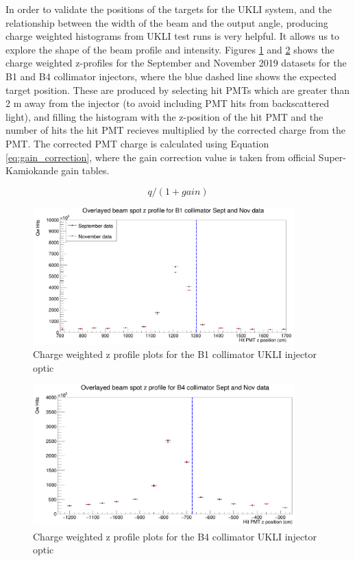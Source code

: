In order to validate the positions of the targets for the UKLI system, and the relationship between the width of the beam and the output angle, producing charge weighted histograms from UKLI test runs is very helpful. It allows us to explore the shape of the beam profile and intensity. Figures \ref{fig:charge_weighted_nov_sept_B1} and \ref{fig:charge_weighted_nov_sept_B4} shows the charge weighted z-profiles for the September and November 2019 datasets for the B1 and B4 collimator injectors, where the blue dashed line shows the expected target position. These are produced by selecting hit PMTs which are greater than 2 m away from the injector (to avoid including PMT hits from backscattered light), and filling the histogram with the z-position of the hit PMT and the number of hits the hit PMT recieves multiplied by the corrected charge from the PMT. The corrected PMT charge is calculated using Equation \ref{eq:gain_correction}, where the gain correction value is taken from official Super-Kamiokande gain tables. 

\begin{equation}
    q/(1 + gain)
\label{eq:gain_correction}
\end{equation}

\begin{figure}
    \centering
    \includegraphics[width=0.9\textwidth]{Figures/charge_weighted_nov_sept_B1.PNG}
    \caption{Charge weighted z profile plots for the B1 collimator UKLI injector optic}
    \label{fig:charge_weighted_nov_sept_B1}
\end{figure}

\begin{figure}
    \centering
    \includegraphics[width=0.9\textwidth]{Figures/charge_weighted_nov_sept_B4.PNG}
    \caption{Charge weighted z profile plots for the B4 collimator UKLI injector optic}
    \label{fig:charge_weighted_nov_sept_B4}
\end{figure}


